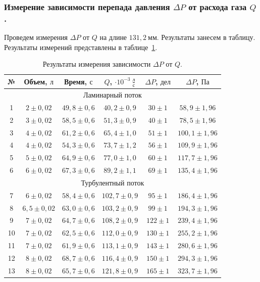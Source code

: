 \documentclass[a4paper,11pt]{article}
\begin{document}
\subsubsection{Измерение зависимости перепада давления $\Delta P$ от расхода газа $Q$.}
Проведем измерения $\Delta P$ от $Q$ на длине $131,2\ мм$. Результаты занесем в таблицу. Результаты измерений представлены в таблице~\ref{table:tab1}.
\begin{table}[h!]
\centering
\begin{tabular}{ ||c|c|c|c|c|c|| }
  \hline
  № & Объем, $л$ & Время, $с$ & $Q$, $\cdot 10^{-3}\ \frac{л}{с}$ & $\Delta P$, $дел$ & $\Delta P$, $Па$ \\
  \hline
  \multicolumn{6}{||c||}{Ламинарный поток} \\
  \hline
  1 & $2 \pm 0,02$ & $49,8 \pm 0,6$ & $40,2 \pm 0,9$ & $30 \pm 1$ & $58,9 \pm 1,96$ \\
  2 & $3 \pm 0,02$ & $58,5 \pm 0,6$ & $51,3 \pm 0,9$ & $40 \pm 1$ & $78,5 \pm 1,96$ \\
  3 & $4 \pm 0,02$ & $61,2 \pm 0,6$ & $65,4 \pm 1,0$ & $51 \pm 1$ & $100,1 \pm 1,96$ \\
  4 & $4 \pm 0,02$ & $54,3 \pm 0,6$ & $73,7 \pm 1,2$ & $56 \pm 1$ & $109,9 \pm 1,96$ \\
  5 & $5 \pm 0,02$ & $64,9 \pm 0,6$ & $77,0 \pm 1,0$ & $60 \pm 1$ & $117,7 \pm 1,96$ \\
  6 & $6 \pm 0,02$ & $67,3 \pm 0,6$ & $89,2 \pm 1,1$ & $69 \pm 1$ & $135,4 \pm 1,96$ \\
  \hline
  \multicolumn{6}{||c||}{Турбулентный поток} \\
  \hline
  7 &  $6 \pm 0,02$  & $58,4 \pm 0,6$ & $102,7 \pm 0,9$ & $95 \pm 1$  & $186,4 \pm 1,96$ \\
  8 & $6,5 \pm 0,02$ & $63,0 \pm 0,6$ & $103,2 \pm 0,9$ & $99 \pm 1$  & $194,3 \pm 1,96$ \\
  9 &  $7 \pm 0,02$  & $64,7 \pm 0,6$ & $108,2 \pm 0,9$ & $122 \pm 1$ & $239,4 \pm 1,96$ \\
  10 & $7 \pm 0,02$  & $62,5 \pm 0,6$ & $112,0 \pm 0,9$ & $130 \pm 1$ & $255,2 \pm 1,96$ \\
  11 & $7 \pm 0,02$  & $61,9 \pm 0,6$ & $113,1 \pm 0,9$ & $143 \pm 1$ & $280,6 \pm 1,96$ \\
  12 & $8 \pm 0,02$  & $68,7 \pm 0,6$ & $116,4 \pm 0,9$ & $150 \pm 1$ & $294,3 \pm 1,96$ \\
  13 & $8 \pm 0,02$  & $65,7 \pm 0,6$ & $121,8 \pm 0,9$ & $165 \pm 1$ & $323,7 \pm 1,96$ \\
  \hline
\end{tabular}
\caption{Результаты измерения зависимости $\Delta P$ от $Q$.}
\label{table:tab1}
\end{table}
\end{document}
